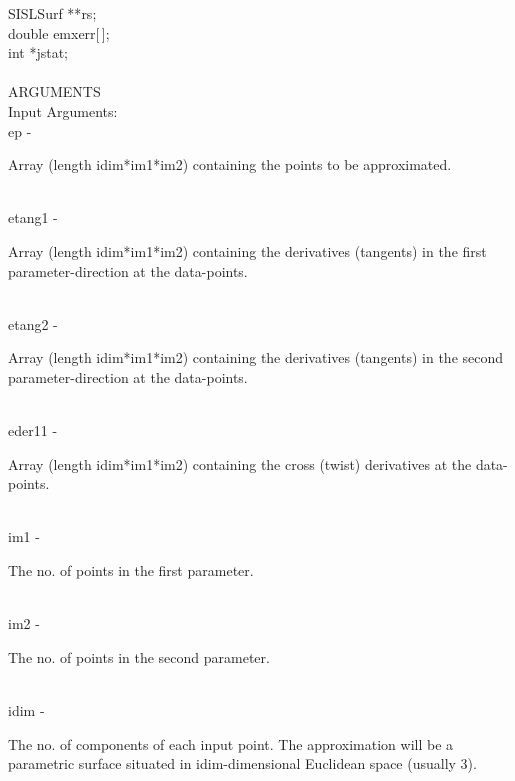                 \>\>    SISLSurf    \>  **{\fov rs};\\
                \>\>    double \> {\fov emxerr}[\,];\\
                \>\>    int    \>  *{\fov jstat};\\
\\
ARGUMENTS\\
	\>Input Arguments:\\
        \>\>    {\fov ep}\> - \>  \begin{minipg2}
                     Array (length idim*im1*im2) containing the points
                  to be approximated.
                               \end{minipg2}\\[0.8ex]
        \>\>    {\fov etang1}\> - \>  \begin{minipg2}
                     Array (length idim*im1*im2) containing the derivatives
                  (tangents) in the first parameter-direction at the
                  data-points.
                               \end{minipg2}\\[0.8ex]
        \>\>    {\fov etang2}\> - \>  \begin{minipg2}
                     Array (length idim*im1*im2) containing the derivatives
                  (tangents) in the second parameter-direction at the
                  data-points.
                               \end{minipg2}\\[0.8ex]
        \>\>    {\fov eder11}\> - \>  \begin{minipg2}
                     Array (length idim*im1*im2) containing the cross (twist)
                  derivatives at the data-points.
                               \end{minipg2}\\[0.8ex]
        \>\>    {\fov im1}\> - \>  \begin{minipg2}
                    The no. of points in the first parameter.
                               \end{minipg2}\\[0.8ex]
        \>\>    {\fov im2}\> - \>  \begin{minipg2}
                    The no. of points in the second parameter.
                               \end{minipg2}\\[0.8ex]
        \>\>    {\fov idim}\> - \>  \begin{minipg2}
                    The no. of components of each input point.
                  The approximation will be a parametric surface
                  situated in idim-dimensional Euclidean space
                  (usually 3).
                               \end{minipg2}\\[0.8ex]
